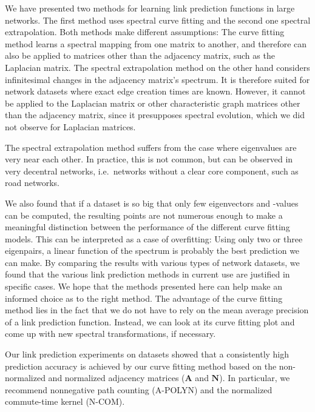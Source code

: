 \documentclass[11pt,a4paper]{book}
\begin{document}
We have presented two methods for learning link prediction
functions in large networks.  The first method uses spectral curve
fitting and the second one spectral extrapolation. Both methods make
different assumptions:  The curve fitting method learns a spectral
mapping from one matrix to another, and therefore can also be applied to
matrices other than the adjacency matrix, such as the Laplacian matrix.
The spectral extrapolation method on the other hand considers
infinitesimal changes in the adjacency matrix's spectrum.  It is
therefore suited for network datasets where exact edge creation times
are known.  However, it cannot be applied to the Laplacian matrix or
other characteristic graph matrices other than the adjacency matrix,
since it presupposes spectral evolution, which we did not observe for
Laplacian matrices. 

The spectral extrapolation method suffers from the case where
eigenvalues are very near each 
other.  In practice, this is not common, but can be observed in very
decentral networks, i.e.\ networks without a clear core component, such
as road networks. 

We also found that if a dataset is so big that only few eigenvectors and
-values can be computed, the resulting points are not numerous enough to
make a meaningful distinction between the performance of the different
curve fitting models.  This can be interpreted as a case of overfitting:
Using only two or three eigenpairs, a linear function of the spectrum is
probably the best prediction we can make.  By comparing the results with
various types of network datasets, we found that the various link
prediction methods in current use are justified in specific cases.  We
hope that the methods presented here can help make an informed choice as
to the right method.  The advantage of the curve fitting method lies in
the fact that we do not have to rely on the mean average precision of a
link prediction function.  Instead, we can look at its curve fitting
plot and come up with new spectral transformations, if necessary.

Our link prediction experiments on datasets showed that
a consistently high prediction accuracy is achieved by our curve fitting
method based on the non-normalized and normalized adjacency matrices
($\mathbf A$ and $\mathbf N$).  In particular, we recommend nonnegative
path counting (\textrm{A-POLYN}) and the normalized commute-time kernel
(\textrm{N-COM}). 
\end{document}
